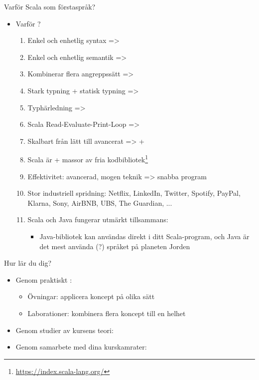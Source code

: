 \begin{SlideExtra}{Varför Scala som förstaspråk?}
\begin{itemize}
\item Varför ?
\begin{enumerate}
\item Enkel och enhetlig syntax => 
\item Enkel och enhetlig semantik => 
\item Kombinerar flera angreppssätt => 
\item Stark typning + statisk typning =>  
\item Typhärledning => 
\item Scala Read-Evaluate-Print-Loop => 
\item Skalbart från lätt till avancerat =>  + 
\item Scala är  + massor av fria kodbibliotek\footnote{\url{https://index.scala-lang.org/}} 
\item Effektivitet: avancerad, mogen teknik => snabba program
\item Stor industriell spridning: Netflix, LinkedIn, Twitter, Spotify, PayPal, Klarna, Sony, AirBNB, UBS, The Guardian, ...
\item Scala och Java fungerar utmärkt tillsammans:
\begin{itemize}
\item Java-bibliotek kan användas direkt i ditt Scala-program, och Java är det mest använda (?) språket på planeten Jorden
\end{itemize}
\end{enumerate}
\end{itemize}
\end{SlideExtra}
\fi


\begin{Slide}{Hur lär du dig?}
\begin{itemize}
\item Genom praktiskt : 
\begin{itemize}
\item Övningar: applicera koncept på olika sätt
\item Laborationer: kombinera flera koncept till en helhet
\end{itemize}
\item Genom studier av kursens teori: 
\item Genom samarbete med dina kurskamrater: 
\end{itemize}
\end{Slide}

